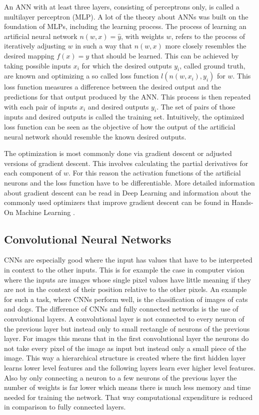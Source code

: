 An ANN with at least three layers, consisting of perceptrons only, is called a multilayer perceptron (MLP).
A lot of the theory about ANNs was built on the foundation of MLPs, including the learning process.
The process of learning an artificial neural network $n(w, x)=\hat{y}$, with weights $w$, refers to the process
of iteratively adjusting $w$ in such a way that $n(w, x )$ more closely resembles the desired mapping  $f(x)=y$
that should be learned. This can be achieved by taking possible inputs $x_{i}$ for which the 
desired outputs $y_{i}$, called ground truth,
are known and optimizing a so called loss function $l(n(w,x_{i}),y_{i})$ for $w$.
This loss function measures a difference between the desired output and the predictions for that output produced
by the ANN.
This process is then repeated with each pair of inputs $x_{i}$ and desired outputs $y_{i}$. The set of pairs of
those inputs and desired outputs is called the training set. 
Intuitively, the optimized loss function can be seen as the objective of how the output of the artificial neural
network should resemble the known desired outputs.

The optimization is most commonly done via gradient descent or adjusted versions of gradient descent.
This involves calculating the partial derivatives for each component of $w$.
For this reason the activation functions of the artificial neurons and the loss function have to be
differentiable. More detailed information about gradient descent can be read in Deep Learning
\parencite{2016-goodfellow-deep} and information about the commonly used optimizers that improve 
gradient descent can be found in Hands-On Machine Learning \parencite{2017-geron-homl}.

\subsection{Convolutional Neural Networks}

CNNs are especially good where the input has values that have to be interpreted in context to the other
inputs. This is for example the case in computer vision where the inputs are images whose
single pixel values have little
meaning if they are not in the context of their position relative to the other pixels. An example for
such a task, where CNNs perform well, is the classification of images of cats and dogs.
The difference of CNNs and fully connected networks is the use of convolutional layers.
A convolutional layer is not connected to every neuron of the previous layer but instead only to small
rectangle of neurons of the previous layer. For images this means that in the first convolutional layer
the neurons do not take every pixel of the image as input but instead only a small piece of the image.
This way a hierarchical structure is created where the first hidden layer learns lower level features
and the following layers learn ever higher level features. Also by only connecting a neuron to a few
neurons of the previous layer the number of weights is far lower which means there is much less memory
and time needed for training the network. That way computational expenditure is reduced in comparison
to fully connected layers.

